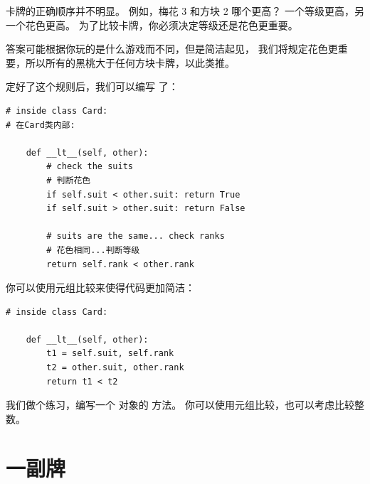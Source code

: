 卡牌的正确顺序并不明显。  
例如，梅花 3 和方块 2 哪个更高？  
一个等级更高，另一个花色更高。  
为了比较卡牌，你必须决定等级还是花色更重要。  


答案可能根据你玩的是什么游戏而不同，但是简洁起见，
我们将规定花色更重要，所以所有的黑桃大于任何方块卡牌，以此类推。



定好了这个规则后，我们可以编写  了：

\begin{lstlisting}
# inside class Card:    
# 在Card类内部:

    def __lt__(self, other):
        # check the suits
        # 判断花色
        if self.suit < other.suit: return True
        if self.suit > other.suit: return False

        # suits are the same... check ranks
        # 花色相同...判断等级
        return self.rank < other.rank
\end{lstlisting}


你可以使用元组比较来使得代码更加简洁：


\begin{lstlisting}
# inside class Card:

    def __lt__(self, other):
        t1 = self.suit, self.rank
        t2 = other.suit, other.rank
        return t1 < t2
\end{lstlisting}

%

我们做个练习，编写一个  对象的 方法。  
你可以使用元组比较，也可以考虑比较整数。


\section{一副牌}

